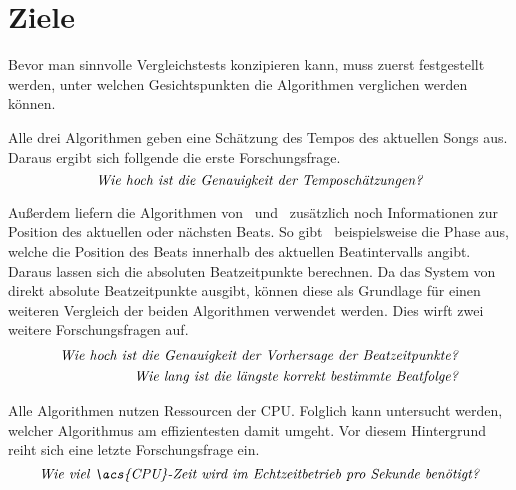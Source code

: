 \section{Ziele} \label{konzept/ziele}
{
	Bevor man sinnvolle Vergleichstests konzipieren kann,
		muss zuerst festgestellt werden,
		unter welchen Gesichtspunkten die Algorithmen verglichen werden können.

	Alle drei Algorithmen geben eine Schätzung des Tempos des aktuellen Songs aus.
	Daraus ergibt sich follgende die erste Forschungsfrage.
	\begin{equation}
		\label{question:tempo}
		\text{\emph{Wie hoch ist die Genauigkeit der Temposchätzungen?}}
	\end{equation}

	Au{\ss}erdem liefern die Algorithmen von~\cite{2009_DaPlSt} und~\cite{2011_PlRoSt} zusätzlich noch Informationen zur Position des aktuellen oder nächsten Beats.
	So gibt~\cite{2011_PlRoSt} beispielsweise die Phase aus,
		welche die Position des Beats innerhalb des aktuellen Beatintervalls angibt.
	Daraus lassen sich die absoluten Beatzeitpunkte berechnen.
	Da das System von~\cite{2009_DaPlSt} direkt absolute Beatzeitpunkte ausgibt,
		können diese als Grundlage für einen weiteren Vergleich der beiden Algorithmen verwendet werden.
	Dies wirft zwei weitere Forschungsfragen auf.
	\begin{align}
		\label{question:beat}
		\text{\emph{Wie hoch ist die Genauigkeit der Vorhersage der Beatzeitpunkte?}} \\
		\label{question:streak}
		\text{\emph{Wie lang ist die längste korrekt bestimmte Beatfolge?}}
	\end{align}

	Alle Algorithmen nutzen Ressourcen der \ac{CPU}.
	Folglich kann untersucht werden,
		welcher Algorithmus am effizientesten damit umgeht.
	Vor diesem Hintergrund reiht sich eine letzte Forschungsfrage ein.
	\begin{equation}
		\label{question:cpu_time}
		\text{\emph{Wie viel \acs{CPU}-Zeit wird im Echtzeitbetrieb pro Sekunde benötigt?}}
	\end{equation}
}

